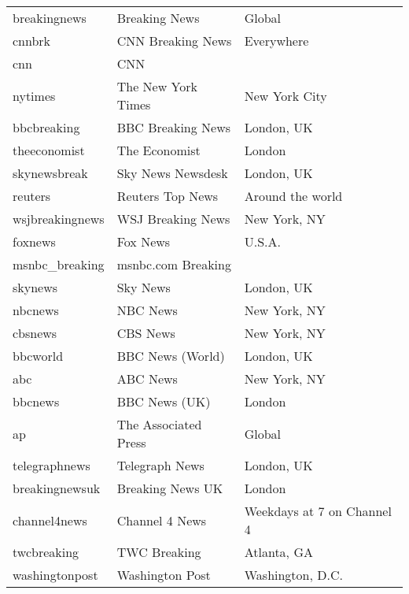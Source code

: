 \begin{longtable}{l|l|l}
 breakingnews     &  Breaking News         &  Global                      \\
 cnnbrk           &  CNN Breaking News     &  Everywhere                  \\
 cnn              &  CNN                   &                              \\
 nytimes          &  The New York Times    &  New York City               \\
 bbcbreaking      &  BBC Breaking News     &  London, UK                  \\
 theeconomist     &  The Economist         &  London                      \\
 skynewsbreak     &  Sky News Newsdesk     &  London, UK                  \\
 reuters          &  Reuters Top News      &  Around the world            \\
 wsjbreakingnews  &  WSJ Breaking News     &  New York, NY                \\
 foxnews          &  Fox News              &  U.S.A.                      \\
 msnbc\_breaking   &  msnbc.com Breaking    &                              \\
 skynews          &  Sky News              &  London, UK                  \\
 nbcnews          &  NBC News              &  New York, NY                \\
 cbsnews          &  CBS News              &  New York, NY                \\
 bbcworld         &  BBC News (World)      &  London, UK                  \\
 abc              &  ABC News              &  New York, NY                \\
 bbcnews          &  BBC News (UK)         &  London                      \\
 ap               &  The Associated Press  &  Global                      \\
 telegraphnews    &  Telegraph News        &  London, UK                  \\
 breakingnewsuk   &  Breaking News UK      &  London                      \\
 channel4news     &  Channel 4 News        &  Weekdays at 7 on Channel 4  \\
 twcbreaking      &  TWC Breaking          &  Atlanta, GA                 \\
 washingtonpost   &  Washington Post       &  Washington, D.C.            \\

\end{longtable}
